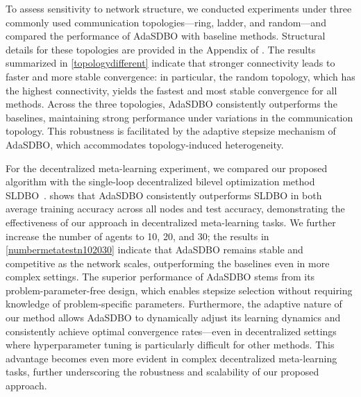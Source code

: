 \documentclass{article}
\theoremstyle{plain}
\theoremstyle{definition}
\theoremstyle{remark}
\begin{document}
To assess sensitivity to network structure, we conducted experiments under three commonly used communication topologies—ring, ladder, and random—and compared the performance of AdaSDBO with baseline methods. Structural details for these topologies are provided in the Appendix of \citep{li2024problem}. The results summarized in \cref{topologydifferent} indicate that stronger connectivity leads to faster and more stable convergence: in particular, the random topology, which has the highest connectivity, yields the fastest and most stable convergence for all methods. Across the three topologies, AdaSDBO consistently outperforms the baselines, maintaining strong performance under variations in the communication topology. This robustness is facilitated by the adaptive stepsize mechanism of AdaSDBO, which accommodates topology-induced heterogeneity.

For the decentralized meta-learning experiment, we compared our proposed algorithm with the single-loop decentralized bilevel optimization method SLDBO~\citep{dong2023single}.  shows that AdaSDBO consistently outperforms SLDBO in both average training accuracy across all nodes and test accuracy, demonstrating the effectiveness of our approach in decentralized meta-learning tasks. We further increase the number of agents to 10, 20, and 30; the results in \cref{numbermetatestn102030} indicate that AdaSDBO remains stable and competitive as the network scales, outperforming the baselines even in more complex settings.
The superior performance of AdaSDBO stems from its problem-parameter-free design, which enables stepsize selection without requiring knowledge of problem-specific parameters. Furthermore, the adaptive nature of our method allows AdaSDBO to dynamically adjust its learning dynamics and consistently achieve optimal convergence rates—even in decentralized settings where hyperparameter tuning is particularly difficult for other methods. This advantage becomes even more evident in complex decentralized meta-learning tasks, further underscoring the robustness and scalability of our proposed approach.
\end{document}
